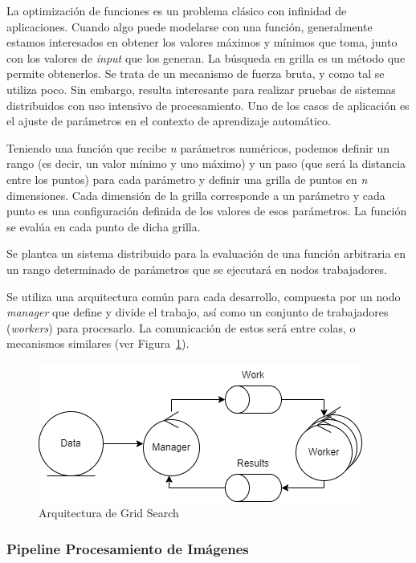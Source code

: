 \documentclass[11pt]{article}
\let\Oldsubsubsection\subsubsection
\renewcommand{\subsubsection}{\FloatBarrier\Oldsubsubsection}
\newcommand{\english}[1]{\textit{#1}}
\begin{document}
La optimización de funciones es un problema clásico con infinidad de aplicaciones. Cuando algo puede modelarse con una función, generalmente estamos interesados en obtener los valores máximos y mínimos que toma, junto con los valores de \english{input} que los generan. La búsqueda en grilla es un método que permite obtenerlos. Se trata de un mecanismo de fuerza bruta, y como tal se utiliza poco. Sin embargo, resulta interesante para realizar pruebas de sistemas distribuidos con uso intensivo de procesamiento. Uno de los casos de aplicación es el ajuste de parámetros en el contexto de aprendizaje automático.

Teniendo una función que recibe \textit{n} parámetros numéricos, podemos definir un rango (es decir, un valor mínimo y uno máximo) y un paso (que será la distancia entre los puntos) para cada parámetro y definir una grilla de puntos en \textit{n} dimensiones.
Cada dimensión de la grilla corresponde a un parámetro y cada punto es una configuración definida de los valores de esos parámetros.
La función se evalúa en cada punto de dicha grilla.

Se plantea un sistema distribuido para la evaluación de una función arbitraria en un rango determinado de parámetros que se ejecutará en nodos trabajadores.

Se utiliza una arquitectura común para cada desarrollo, compuesta por un nodo \english{manager} que define y divide el trabajo, así como un conjunto de trabajadores (\english{workers}) para procesarlo. La comunicación de estos será entre colas, o mecanismos similares (ver Figura~\ref{fig:sis_dist:grid_search_arch}).

\begin{figure}[h]
    \centering
    \includegraphics[scale=0.5]{resources/distributed_systems/grid_search_arch.png}
    \caption{Arquitectura de Grid Search}
    \label{fig:sis_dist:grid_search_arch}
\end{figure}

\newpage

\subsubsection{Pipeline Procesamiento de Imágenes} \label{sec:ip_desc}
\end{document}
